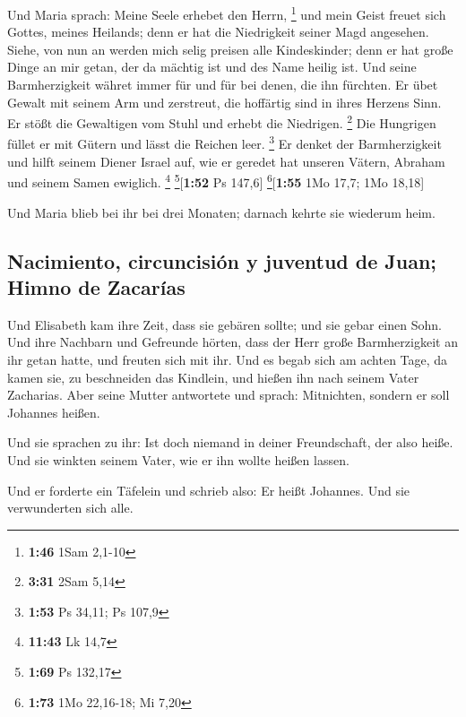  Und Maria sprach: Meine Seele erhebet den Herrn,
\footnote{\textbf{1:46} 1Sam 2,1-10}  und mein Geist
freuet sich Gottes, meines Heilands;  denn er hat die
Niedrigkeit seiner Magd angesehen. Siehe, von nun an werden mich selig
preisen alle Kindeskinder;  denn er hat große Dinge an
mir getan, der da mächtig ist und des Name heilig ist. 
Und seine Barmherzigkeit währet immer für und für bei denen, die ihn
fürchten.  Er übet Gewalt mit seinem Arm und zerstreut,
die hoffärtig sind in ihres Herzens Sinn.  Er stößt die
Gewaltigen vom Stuhl und erhebt die Niedrigen. \footnote{\textbf{3:31}
  2Sam 5,14}  Die Hungrigen füllet er mit Gütern und
lässt die Reichen leer. \footnote{\textbf{1:53} Ps 34,11; Ps 107,9}
 Er denket der Barmherzigkeit und hilft seinem Diener
Israel auf,  wie er geredet hat unseren Vätern, Abraham
und seinem Samen ewiglich. \footnote{\textbf{11:43} Lk 14,7}
\footnote{\textbf{1:69} Ps 132,17}{[}\textbf{1:52} Ps 147,6{]}
\footnote{\textbf{1:73} 1Mo 22,16-18; Mi 7,20}{[}\textbf{1:55} 1Mo 17,7;
1Mo 18,18{]}

 Und Maria blieb bei ihr bei drei Monaten; darnach kehrte
sie wiederum heim.

\hypertarget{nacimiento-circuncisiuxf3n-y-juventud-de-juan-himno-de-zacaruxedas}{%
\subsection{Nacimiento, circuncisión y juventud de Juan; Himno de
Zacarías}\label{nacimiento-circuncisiuxf3n-y-juventud-de-juan-himno-de-zacaruxedas}}

 Und Elisabeth kam ihre Zeit, dass sie gebären sollte;
und sie gebar einen Sohn.  Und ihre Nachbarn und
Gefreunde hörten, dass der Herr große Barmherzigkeit an ihr getan hatte,
und freuten sich mit ihr.  Und es begab sich am achten
Tage, da kamen sie, zu beschneiden das Kindlein, und hießen ihn nach
seinem Vater Zacharias.  Aber seine Mutter antwortete und
sprach: Mitnichten, sondern er soll Johannes heißen.

 Und sie sprachen zu ihr: Ist doch niemand in deiner
Freundschaft, der also heiße.  Und sie winkten seinem
Vater, wie er ihn wollte heißen lassen.

 Und er forderte ein Täfelein und schrieb also: Er heißt
Johannes. Und sie verwunderten sich alle.

